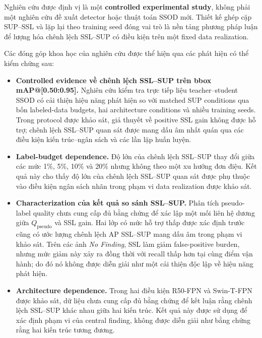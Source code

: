\documentclass[pdflatex,sn-mathphys-num]{sn-jnl}%
\theoremstyle{thmstyleone}%
\theoremstyle{thmstyletwo}%
\theoremstyle{thmstylethree}%
\begin{document}
Nghiên cứu được định vị là một \textbf{controlled experimental study}, không
phải một nghiên cứu đề xuất detector hoặc thuật toán SSOD mới. Thiết kế ghép
cặp SUP--SSL và lặp lại theo training seed đóng vai trò là nền tảng phương pháp
luận để lượng hóa chênh lệch SSL--SUP có điều kiện trên một fixed data
realization.

Các đóng góp khoa học của nghiên cứu được thể hiện qua các phát hiện có thể
kiểm chứng sau:

\begin{itemize}

    \item \textbf{Controlled evidence về chênh lệch SSL--SUP trên bbox mAP@[0.50:0.95].}
    Nghiên cứu kiểm tra trực tiếp liệu teacher--student SSOD có cải thiện hiệu năng phát hiện so với matched SUP conditions qua bốn labeled-data budgets,
    hai architecture conditions và nhiều training seeds. Trong protocol được
    khảo sát, giả thuyết về positive SSL gain không được hỗ trợ; chênh lệch SSL--SUP quan
    sát được mang dấu âm nhất quán qua các điều kiện kiến trúc--ngân sách và
    các lần lặp huấn luyện.

    \item \textbf{Label-budget dependence.}
    Độ lớn của chênh lệch SSL--SUP thay đổi giữa các mức 1\%, 5\%, 10\% và
    20\% nhưng không theo một xu hướng đơn điệu. Kết quả này cho thấy độ lớn
    của chênh lệch SSL--SUP quan sát được phụ thuộc vào điều kiện ngân sách nhãn trong
    phạm vi data realization được khảo sát.

    \item \textbf{Characterization của kết quả so sánh SSL--SUP.}
    Phân tích pseudo-label quality chưa cung cấp đủ bằng chứng để xác lập một
    mối liên hệ dương giữa \(Q_{\mathrm{pseudo}}\) và SSL gain. Hai lớp có mức
    hỗ trợ thấp được xác định trước cũng có ước lượng chênh lệch AP SSL--SUP mang dấu âm trong phạm vi
    khảo sát. Trên các ảnh \textit{No Finding}, SSL làm giảm false-positive
    burden, nhưng mức giảm này xảy ra đồng thời với recall thấp hơn tại cùng
    điểm vận hành; do đó nó không được diễn giải như một cải thiện độc lập về
    hiệu năng phát hiện.

    \item \textbf{Architecture dependence.}
    Trong hai điều kiện R50-FPN và Swin-T-FPN được khảo sát, dữ liệu chưa cung
    cấp đủ bằng chứng để kết luận rằng chênh lệch SSL--SUP khác nhau giữa hai
    kiến trúc. Kết quả này được sử dụng để xác định phạm vi của central finding,
    không được diễn giải như bằng chứng rằng hai kiến trúc tương đương.

\end{itemize}
\end{document}
